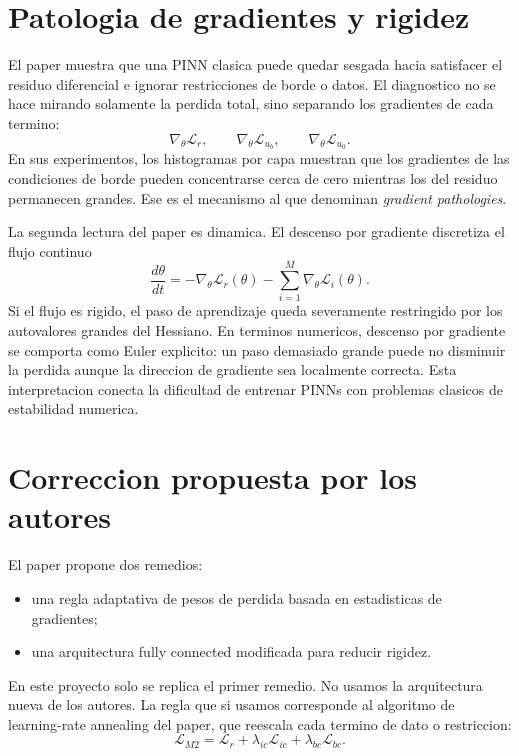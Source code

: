 \documentclass[11pt,a4paper]{article}
\begin{document}
\section{Patologia de gradientes y rigidez}

El paper muestra que una PINN clasica puede quedar sesgada hacia satisfacer el
residuo diferencial e ignorar restricciones de borde o datos. El diagnostico no
se hace mirando solamente la perdida total, sino separando los gradientes de
cada termino:
\begin{equation}
  \nabla_\theta \mathcal{L}_r,\qquad
  \nabla_\theta \mathcal{L}_{u_b},\qquad
  \nabla_\theta \mathcal{L}_{u_0}.
\end{equation}
En sus experimentos, los histogramas por capa muestran que los gradientes de
las condiciones de borde pueden concentrarse cerca de cero mientras los del
residuo permanecen grandes. Ese es el mecanismo al que denominan
\emph{gradient pathologies}.

La segunda lectura del paper es dinamica. El descenso por gradiente discretiza
el flujo continuo
\begin{equation}
  \frac{d\theta}{dt} =
  -\nabla_\theta \mathcal{L}_r(\theta)
  -\sum_{i=1}^{M}\nabla_\theta \mathcal{L}_i(\theta).
\end{equation}
Si el flujo es rigido, el paso de aprendizaje queda severamente restringido por
los autovalores grandes del Hessiano. En terminos numericos, descenso por
gradiente se comporta como Euler explicito: un paso demasiado grande puede no
disminuir la perdida aunque la direccion de gradiente sea localmente correcta.
Esta interpretacion conecta la dificultad de entrenar PINNs con problemas
clasicos de estabilidad numerica.

\section{Correccion propuesta por los autores}

El paper propone dos remedios:
\begin{itemize}
  \item una regla adaptativa de pesos de perdida basada en estadisticas de
  gradientes;
  \item una arquitectura fully connected modificada para reducir rigidez.
\end{itemize}

En este proyecto solo se replica el primer remedio. No usamos la arquitectura
nueva de los autores. La regla que si usamos corresponde al algoritmo de
learning-rate annealing del paper, que reescala cada termino de dato o
restriccion:
\begin{equation}
  \mathcal{L}_{M2} =
  \mathcal{L}_r +
  \lambda_{ic}\mathcal{L}_{ic} +
  \lambda_{bc}\mathcal{L}_{bc}.
\end{equation}
\end{document}
